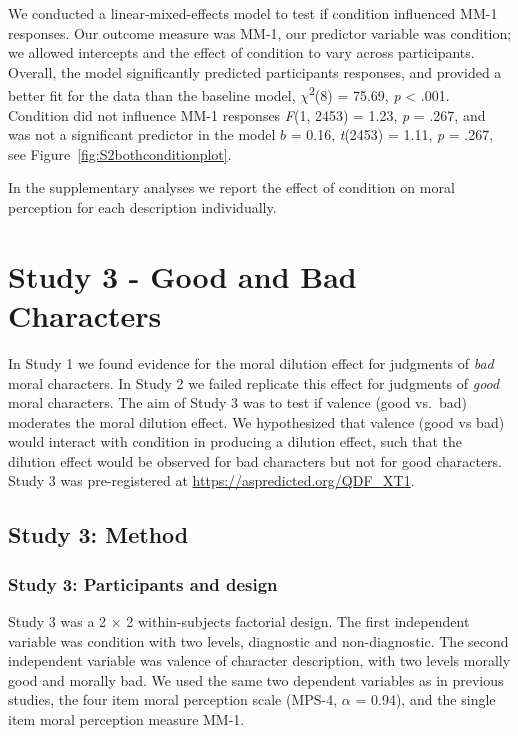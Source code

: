 \documentclass[
  english,
  man,floatsintext]{apa7}
\begin{document}
We conducted a linear-mixed-effects model to test if condition influenced MM-1 responses. Our outcome measure was MM-1, our predictor variable was condition; we allowed intercepts and the effect of condition to vary across participants. Overall, the model significantly predicted participants responses, and provided a better fit for the data than the baseline model, \(\chi\)\textsuperscript{2}(8) = 75.69, \emph{p} \textless{} .001. Condition did not influence MM-1 responses \emph{F}(1, 2453) = 1.23, \emph{p} = .267, and was not a significant predictor in the model \(b\) = 0.16, \emph{t}(2453) = 1.11, \emph{p} = .267, see Figure~\ref{fig:S2bothconditionplot}.

In the supplementary analyses we report the effect of condition on moral perception for each description individually.

\hypertarget{study-3---good-and-bad-characters}{%
\section{Study 3 - Good and Bad Characters}\label{study-3---good-and-bad-characters}}

In Study 1 we found evidence for the moral dilution effect for judgments of \emph{bad} moral characters. In Study 2 we failed replicate this effect for judgments of \emph{good} moral characters. The aim of Study 3 was to test if valence (good vs.~bad) moderates the moral dilution effect. We hypothesized that valence (good vs bad) would interact with condition in producing a dilution effect, such that the dilution effect would be observed for bad characters but not for good characters. Study 3 was pre-registered at \color{blue}\url{https://aspredicted.org/QDF_XT1}\color{black}.

\hypertarget{study-3-method}{%
\subsection{Study 3: Method}\label{study-3-method}}

\hypertarget{study-3-participants-and-design}{%
\subsubsection{Study 3: Participants and design}\label{study-3-participants-and-design}}

Study 3 was a 2 \(\times\) 2 within-subjects factorial design. The first independent variable was condition with two levels, diagnostic and non-diagnostic. The second independent variable was valence of character description, with two levels morally good and morally bad. We used the same two dependent variables as in previous studies, the four item moral perception scale (MPS-4, \(\alpha\) = 0.94), and the single item moral perception measure MM-1.
\end{document}
